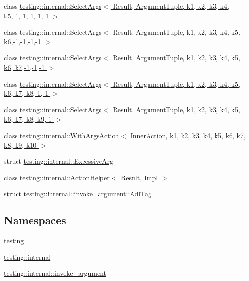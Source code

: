 \begin{DoxyCompactItemize}
\item 
class \hyperlink{classtesting_1_1internal_1_1_select_args_3_01_result_00_01_argument_tuple_00_01k1_00_01k2_00_01k6e7fa8d2e210d646d72ee410b10aa03c}{testing\+::internal\+::\+Select\+Args$<$ Result, Argument\+Tuple, k1, k2, k3, k4, k5,-\/1,-\/1,-\/1,-\/1,-\/1 $>$}
\item 
class \hyperlink{classtesting_1_1internal_1_1_select_args_3_01_result_00_01_argument_tuple_00_01k1_00_01k2_00_01kcf9f143d8f94d88842866ea3565bd3c0}{testing\+::internal\+::\+Select\+Args$<$ Result, Argument\+Tuple, k1, k2, k3, k4, k5, k6,-\/1,-\/1,-\/1,-\/1 $>$}
\item 
class \hyperlink{classtesting_1_1internal_1_1_select_args_3_01_result_00_01_argument_tuple_00_01k1_00_01k2_00_01k597f472c4e3b394b8bb76f22686b8756}{testing\+::internal\+::\+Select\+Args$<$ Result, Argument\+Tuple, k1, k2, k3, k4, k5, k6, k7,-\/1,-\/1,-\/1 $>$}
\item 
class \hyperlink{classtesting_1_1internal_1_1_select_args_3_01_result_00_01_argument_tuple_00_01k1_00_01k2_00_01kfe88afb049e01b4212b0813ab5a9c813}{testing\+::internal\+::\+Select\+Args$<$ Result, Argument\+Tuple, k1, k2, k3, k4, k5, k6, k7, k8,-\/1,-\/1 $>$}
\item 
class \hyperlink{classtesting_1_1internal_1_1_select_args_3_01_result_00_01_argument_tuple_00_01k1_00_01k2_00_01kbad6295bde1bc89afd5e3dfe4d52ae94}{testing\+::internal\+::\+Select\+Args$<$ Result, Argument\+Tuple, k1, k2, k3, k4, k5, k6, k7, k8, k9,-\/1 $>$}
\item 
class \hyperlink{classtesting_1_1internal_1_1_with_args_action}{testing\+::internal\+::\+With\+Args\+Action$<$ Inner\+Action, k1, k2, k3, k4, k5, k6, k7, k8, k9, k10 $>$}
\item 
struct \hyperlink{structtesting_1_1internal_1_1_excessive_arg}{testing\+::internal\+::\+Excessive\+Arg}
\item 
class \hyperlink{classtesting_1_1internal_1_1_action_helper}{testing\+::internal\+::\+Action\+Helper$<$ Result, Impl $>$}
\item 
struct \hyperlink{structtesting_1_1internal_1_1invoke__argument_1_1_adl_tag}{testing\+::internal\+::invoke\+\_\+argument\+::\+Adl\+Tag}
\end{DoxyCompactItemize}
\subsection*{Namespaces}
\begin{DoxyCompactItemize}
\item 
 \hyperlink{namespacetesting}{testing}
\item 
 \hyperlink{namespacetesting_1_1internal}{testing\+::internal}
\item 
 \hyperlink{namespacetesting_1_1internal_1_1invoke__argument}{testing\+::internal\+::invoke\+\_\+argument}
\end{DoxyCompactItemize}
